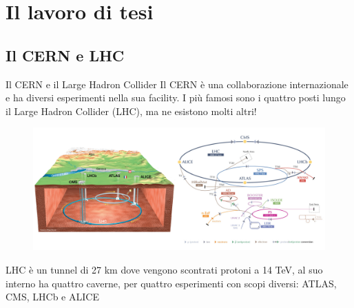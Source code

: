 \documentclass[
10pt,
aspectratio=169,
]{beamer}
\begin{document}
\section{Il lavoro di tesi}
\subsection{Il CERN e LHC}
\begin{frame}{Il CERN e il Large Hadron Collider}
Il CERN è una collaborazione internazionale e ha diversi esperimenti nella sua facility. I più famosi sono i quattro posti lungo il Large Hadron Collider (LHC), ma ne esistono molti altri!
\begin{figure}
    \centering
    \includegraphics[width=0.8\linewidth]{figures/lhc.png}
\end{figure}
    LHC è un tunnel di 27 km dove vengono scontrati protoni a 14 TeV, al suo interno ha quattro caverne, per quattro esperimenti con scopi diversi: ATLAS, CMS, LHCb e ALICE
\end{frame}
\end{document}

